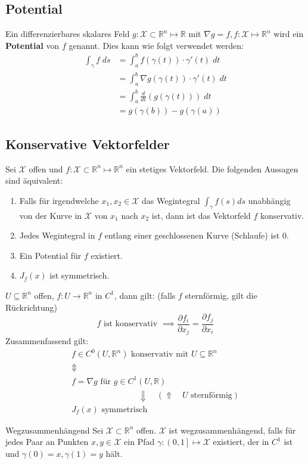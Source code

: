 \documentclass[a4paper,10pt]{article}
\newcommand{\pdv}[2]{\frac{\partial #1}{\partial #2}}
\def\R{\mathbb{R}}
\def\X{\mathcal{X}}
\begin{document}
\subsection{Potential}
Ein differenzierbares skalares Feld $g: \X \subset \R^n \mapsto \R$ mit $\nabla g = f, f: \X \mapsto \R^n$ wird ein \textbf{Potential} von $f$ genannt. Dies kann wie folgt verwendet werden:
\begin{align*}
    \int_\gamma f \; ds & = \int_a^b f(\gamma(t)) \cdot \gamma'(t) \; dt        \\
                        & = \int_a^b \nabla g(\gamma(t)) \cdot \gamma'(t) \; dt \\
                        & = \int_a^b \frac{d}{dt} (g(\gamma(t))) \; dt        \\
                        & = g (\gamma(b)) - g(\gamma(a))        
\end{align*}

\subsection{Konservative Vektorfelder}
Sei $\X$ offen und $f: \X \subset \R^n \mapsto \R^n$ ein stetiges Vektorfeld. Die folgenden Aussagen sind äquivalent:
\begin{enumerate}
    \item Falls für irgendwelche $x_1, x_2 \in \X$ das Wegintegral $\int_\gamma f(s) ds$ unabhängig von der Kurve in $\X$ von $x_1$ nach $x_2$ ist, dann ist das Vektorfeld $f$ konservativ.
    \item Jedes Wegintegral in $f$ entlang einer geschlossenen Kurve (Schlaufe) ist 0.
    \item Ein Potential für $f$ existiert.
    \item $J_f(x)$ ist symmetrisch.
\end{enumerate}
$U\subseteq \mathbb{R}^{n}$ offen, $f:U\to \mathbb{R}^{n}$ in $C^{1}$, dann gilt: 
(falls $f$ sternförmig, gilt die Rückrichtung)
$$f \text{ ist konservativ }\implies \pdv{f_i}{x_j} = \pdv{f_j}{x_i}$$
Zusammenfassend gilt:
\begin{gather*}  
f \in C^{0}(U,\mathbb{R}^{n})\text{ konservativ mit }U \subseteq \mathbb{R}^{n}\\  
\Updownarrow\\  
f=\nabla g\text{ für }g\in C^{1}(U,\mathbb{R})\\  
\qquad\qquad\qquad\qquad \Downarrow \quad(\Uparrow\quad U \text{ sternförmig})\\  
J_{f}(x) \text{ symmetrisch}  
\end{gather*}
\begin{subbox}{Wegzusammenhängend}
    Sei $\X \subset \R^n$ offen. $\X$ ist wegzusammenhängend, falls für jedes Paar an Punkten $x, y \in \X$ ein Pfad $\gamma : \left(0,1\right] \mapsto \X$ existiert, der in $C^1$ ist und $\gamma(0) = x, \gamma(1) = y$ hält.
\end{subbox}
\end{document}

